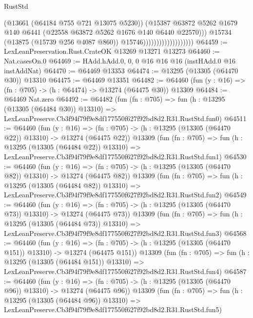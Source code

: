 \begin{lexlean}{RustStd}
\begin{coremodule}
                                            (@13661 (@64184 @755 @721 @13075 @5230))
                                            (@15387
                                              @63872
                                              @5262
                                              @1679
                                              @140
                                              @6441
                                              (@22558 @63872 @5262 @1676 @140 @6440 @22570)))
                                          @15734
                                          (@13875 (@15739 @256 @4087 @860))
                                          @15746)))))))))))))))))))
@64459 := LexLeanPreservation.Rust.CrateOK @13269 @13271 @13273
@64460 := Nat.casesOn.{0}
@64469 := HAdd.hAdd.{0, 0, 0} @16 @16 @16 (instHAdd.{0} @16 instAddNat)
@64470 := @64469 @13353
@64474 := @13295 (@13305 (@64470 @30)) @13310
@64475 := @64469 @13351
@64482 := @64460 (fun (y : @16) => (fn : @705) -> (h : @64474) -> @13274 (@64475 @30)) @13309
@64484 := @64469 Nat.zero
@64492 := @64482
    (fun (fn : @705) =>
    fun (h : @13295 (@13305 (@64484 @30)) @13310) =>
    LexLeanPreserve.Cb3f94f79f9e8df177550f627f92bd8d2.R31.RustStd.fun0)
@64511 := @64460
    (fun (y : @16) =>
    (fn : @705) -> (h : @13295 (@13305 (@64470 @22)) @13310) -> @13274 (@64475 @22))
    @13309
    (fun (fn : @705) =>
    fun (h : @13295 (@13305 (@64484 @22)) @13310) =>
    LexLeanPreserve.Cb3f94f79f9e8df177550f627f92bd8d2.R31.RustStd.fun1)
@64530 := @64460
    (fun (y : @16) =>
    (fn : @705) -> (h : @13295 (@13305 (@64470 @82)) @13310) -> @13274 (@64475 @82))
    @13309
    (fun (fn : @705) =>
    fun (h : @13295 (@13305 (@64484 @82)) @13310) =>
    LexLeanPreserve.Cb3f94f79f9e8df177550f627f92bd8d2.R31.RustStd.fun2)
@64549 := @64460
    (fun (y : @16) =>
    (fn : @705) -> (h : @13295 (@13305 (@64470 @73)) @13310) -> @13274 (@64475 @73))
    @13309
    (fun (fn : @705) =>
    fun (h : @13295 (@13305 (@64484 @73)) @13310) =>
    LexLeanPreserve.Cb3f94f79f9e8df177550f627f92bd8d2.R31.RustStd.fun3)
@64568 := @64460
    (fun (y : @16) =>
    (fn : @705) -> (h : @13295 (@13305 (@64470 @151)) @13310) -> @13274 (@64475 @151))
    @13309
    (fun (fn : @705) =>
    fun (h : @13295 (@13305 (@64484 @151)) @13310) =>
    LexLeanPreserve.Cb3f94f79f9e8df177550f627f92bd8d2.R31.RustStd.fun4)
@64587 := @64460
    (fun (y : @16) =>
    (fn : @705) -> (h : @13295 (@13305 (@64470 @96)) @13310) -> @13274 (@64475 @96))
    @13309
    (fun (fn : @705) =>
    fun (h : @13295 (@13305 (@64484 @96)) @13310) =>
    LexLeanPreserve.Cb3f94f79f9e8df177550f627f92bd8d2.R31.RustStd.fun5)

\end{coremodule}
\end{lexlean}
